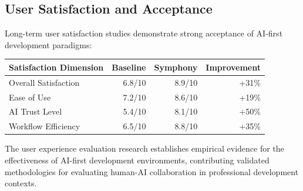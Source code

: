 \subsection*{User Satisfaction and Acceptance}

Long-term user satisfaction studies demonstrate strong acceptance of AI-first development paradigms:

\begin{center}
\begin{tabular}{@{}lrrr@{}}
\toprule
\textbf{Satisfaction Dimension} & \textbf{Baseline} & \textbf{Symphony} & \textbf{Improvement} \\
\midrule
Overall Satisfaction & 6.8/10 & 8.9/10 & +31\% \\
Ease of Use & 7.2/10 & 8.6/10 & +19\% \\
AI Trust Level & 5.4/10 & 8.1/10 & +50\% \\
Workflow Efficiency & 6.5/10 & 8.8/10 & +35\% \\
\bottomrule
\end{tabular}
\end{center}

The user experience evaluation research establishes empirical evidence for the effectiveness of AI-first development environments, contributing validated methodologies for evaluating human-AI collaboration in professional development contexts.
